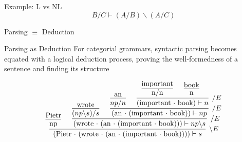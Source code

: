 \documentclass{beamer}
\begin{document}
\begin{frame}{Example: L vs NL}
	\small
	\alert{
	\[
		B/C \vdash (A/B) \backslash (A/C)
	\]
	}
	

\end{frame}

\begin{frame}{Parsing $\equiv$ Deduction}
	\small
	\begin{block}{Parsing as Deduction}
		For categorial grammars, syntactic parsing becomes equated with a logical deduction process, proving the well-formedness of a sentence and finding its structure
	\end{block}
	
	\[
		\infer[\backslash E]{\text{(Pietr $\cdot$ (wrote $\cdot$ (an $\cdot$ (important $\cdot$ book))))} \vdash s}{
			\infer[]{\raisebox{0pt}[7pt]{np}}{\text{Pietr}}
			&
			\infer[/E]{\text{(wrote $\cdot$ (an $\cdot$ (important $\cdot$ book)))} \vdash np\backslash s}{
				\infer[]{(np\backslash s)/s}{\text{wrote}}
				&
				\infer[/E]{\text{(an $\cdot$ (important $\cdot$ book))} \vdash np}{
					\infer[]{np/ n}{\text{an}}
					&
					\infer[/ E]{\text{(important $\cdot$ book)} \vdash n}{
						\infer[]{\raisebox{0pt}[6pt]{n/n}}{\text{important}}
						&
						\infer[]{\raisebox{0pt}[6pt]{n}}{\text{book}}
					}
				}
			}
		}
	\]
\end{frame}
\end{document}

